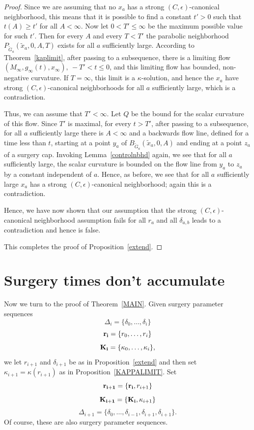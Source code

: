 \begin{proof}
Since we are assuming that no $x_a$ has a strong
$(C,\epsilon)$-canonical neighborhood, this means that it is
possible to find a constant $t'>0$ such that $t(A)\ge t'$ for all
$A<\infty$. Now let $0<T'\le \infty$ be the maximum possible value for such
$t'$. Then for every $A$ and every $T<T'$ the
parabolic neighborhood $P_{\widetilde G_a}(\tilde x_a,0,A,T)$ exists
for all $a$ sufficiently large. According to
Theorem~\ref{kaplimit}, after passing to a subsequence, there is
a limiting flow $(M_\infty,g_\infty(t),x_\infty),\ -T'<t\le 0$, and
this limiting flow has bounded, non-negative curvature.
If $T=\infty$, this limit is a $\kappa$-solution, and hence the $x_a$ have
strong $(C,\epsilon)$-canonical neighborhoods for all $a$ sufficiently large,
which is a contradiction.

Thus, we can assume that $T'<\infty$.
 Let $Q$ be
the bound for the scalar curvature of this flow. Since $T'$ is
maximal, for every $t>T'$, after passing to a subsequence, for all
$a$ sufficiently large there is $A<\infty$ and a backwards flow
line, defined for a time less than $t$, starting at a point $y_a$ of
$B_{\widetilde G_a}(\tilde x_a,0,A)$ and ending at a point $z_a$ of
a surgery cap. Invoking Lemma~\ref{controlnbhd} again, we see that
for all $a$ sufficiently large, the scalar curvature is bounded on
the flow line from $y_a$ to $z_a$ by a constant independent of $a$.
Hence, as before, we see that for all $a$ sufficiently large $x_a$
has a strong $(C,\epsilon)$-canonical neighborhood; again this is  a contradiction.

Hence, we have now shown  that our assumption that the strong
$(C,\epsilon)$-canonical neighborhood assumption fails for all $r_a$
and all $\delta_{a,b}$ leads to a contradiction and hence is false.


This completes the proof of Proposition~\ref{extend}.
\end{proof}


\section{Surgery times don't accumulate}\label{sectcomplete}


Now we turn to the proof of Theorem~\ref{MAIN}.
 Given surgery parameter
sequences $$\Delta_i=\{\delta_0,\ldots,\delta_i\}$$
$${\bf r_i}=\{r_0,\ldots,r_i\}$$
$${\bf K_i}=\{\kappa_0,\ldots,\kappa_i\},$$
 we let
$r_{i+1}$ and $\delta_{i+1}$ be as in Proposition~\ref{extend} and
then set $\kappa_{i+1}=\kappa(r_{i+1})$ as in
Proposition~\ref{KAPPALIMIT}.
 Set $${\bf
r_{i+1}}=\{{\bf r_i},r_{i+1}\}$$
$${\bf K_{i+1}}=\{{\bf
K_i},\kappa_{i+1}\}$$
$$\Delta_{i+1}=\{\delta_0,\ldots,\delta_{i-1},\delta_{i+1},\delta_{i+1}\}.$$
Of course, these are also surgery parameter sequences.

